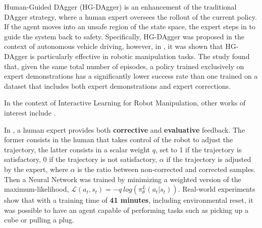 Human-Guided DAgger (HG-DAgger) \cite{kelly2019hg_dagger} is an enhancement of the traditional DAgger strategy, where a human expert oversees the rollout of the current policy. If the agent moves into an unsafe region of the state space, the expert steps in to guide the system back to safety. Specifically, HG-DAgger was proposed in the context of autonomous vehicle driving, however, in \cite{jang2022bc_z}, it was shown that HG-DAgger is particularly effective in robotic manipulation tasks. The study found that, given the same total number of episodes, a policy trained exclusively on expert demonstrations has a significantly lower success rate than one trained on a dataset that includes both expert demonstrations and expert corrections.

In the context of Interactive Learning for Robot Manipulation, other works of interest include \cite{mandlekar2020human_in_the_loop,chisari2022correct}. 

In \cite{chisari2022correct}, a human expert provides both \textbf{corrective} and \textbf{evaluative} feedback. The former consists in the human that takes control of the robot to adjust the trajectory, the latter consists in a scalar weight $q$, set to 1 if the trajectory is satisfactory, 0 if the trajectory is not satisfactory, $\alpha$ if the trajectory is adjusted by the expert, where $\alpha$ is the ratio between non-corrected and corrected samples. Then a Neural Network was trained by minimizing a weighted version of the maximum-likelihood, $\mathcal{L}(a_{t},s_{t}) = - q \ log(\pi^{L}_{\theta}(a_{t}|s_{t}))$. Real-world experiments show that with a training time of \textbf{41 minutes}, including environmental reset, it was possible to have an agent capable of performing tasks such as picking up a cube or pulling a plug.